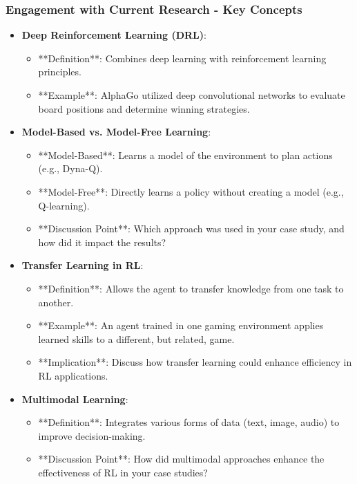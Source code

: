 \documentclass[aspectratio=169]{beamer}
\begin{document}
\begin{frame}[fragile]
    \frametitle{Engagement with Current Research - Key Concepts}
    \begin{itemize}
        \item \textbf{Deep Reinforcement Learning (DRL)}:
        \begin{itemize}
            \item **Definition**: Combines deep learning with reinforcement learning principles.
            \item **Example**: AlphaGo utilized deep convolutional networks to evaluate board positions and determine winning strategies.
        \end{itemize}
        
        \item \textbf{Model-Based vs. Model-Free Learning}:
        \begin{itemize}
            \item **Model-Based**: Learns a model of the environment to plan actions (e.g., Dyna-Q).
            \item **Model-Free**: Directly learns a policy without creating a model (e.g., Q-learning).
            \item **Discussion Point**: Which approach was used in your case study, and how did it impact the results?
        \end{itemize}
        
        \item \textbf{Transfer Learning in RL}:
        \begin{itemize}
            \item **Definition**: Allows the agent to transfer knowledge from one task to another.
            \item **Example**: An agent trained in one gaming environment applies learned skills to a different, but related, game.
            \item **Implication**: Discuss how transfer learning could enhance efficiency in RL applications.
        \end{itemize}
        
        \item \textbf{Multimodal Learning}:
        \begin{itemize}
            \item **Definition**: Integrates various forms of data (text, image, audio) to improve decision-making.
            \item **Discussion Point**: How did multimodal approaches enhance the effectiveness of RL in your case studies?
        \end{itemize}
    \end{itemize}
\end{frame}
\end{document}

